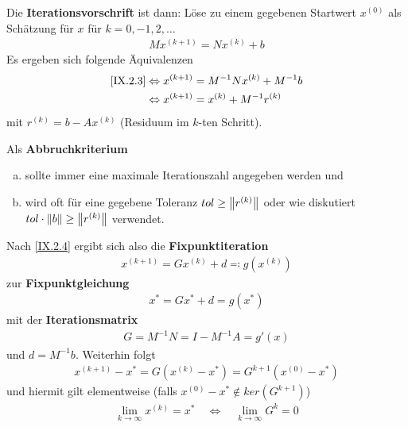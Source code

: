 Die \textbf{Iterationsvorschrift} ist dann: 
Löse zu einem gegebenen Startwert $x^{(0)}$ als Schätzung für $x$
für $k=0,-1,2, \ldots$
\begin{gather}
  Mx^{(k+1)}= Nx^{(k)} +b \label{IX.2.3}
\end{gather}
Es ergeben sich folgende Äquivalenzen
\begin{align}
  \eqref{IX.2.3} &\Leftrightarrow
                   x^{(k+1)} = M^{-1}Nx^{(k)}+M^{-1}b 
                   \label{IX.2.4}\\
                 &\Leftrightarrow x^{(k+1)} = x^{(k)} + M^{-1}r^{(k)}
                   \label{IX.2.5}
\end{align}
mit $r^{(k)}= b-Ax^{(k)}$ (Residuum im $k$-ten Schritt).

Als \textbf{Abbruchkriterium}
\begin{enumerate}[a)]
\item sollte immer eine maximale Iterationszahl angegeben werden und
\item wird oft für eine gegebene Toleranz $tol\geq\left\| r^{(k)} \right\|$
  oder wie diskutiert $tol\cdot \left\| b \right\|\geq \left\| r^{(k)} \right\|$ verwendet.
\end{enumerate}

Nach \eqref{IX.2.4} ergibt sich also die \textbf{Fixpunktiteration}
\begin{gather}
  x^{(k+1)} = Gx^{(k)} +d \eqqcolon g(x^{(k)})
  \label{IX.2.6}
\end{gather}
zur \textbf{Fixpunktgleichung}
\begin{gather*}
  x^{*} = Gx^{*} + d = g(x^{*})
\end{gather*}
mit der \textbf{Iterationsmatrix} 
\begin{gather}
  G=M^{-1}N=I-M^{-1}A = g'(x)
  \label{IX.2.7}
\end{gather}
und $d=M^{-1}b$. Weiterhin folgt
\begin{gather*}
  x^{(k+1)}-x^{*} = G(x^{(k)}-x^{*})=G^{k+1}(x^{(0)}-x^{*})
\end{gather*}
und hiermit gilt elementweise (falls $x^{(0)}-x^{*}\not\in ker
(G^{k+1})$)
\begin{gather*}
  \lim_{k\to\infty} x^{(k)} = x^{*}
  \quad\Leftrightarrow\quad
  \lim_{k\to\infty} G^k =0
\end{gather*}


